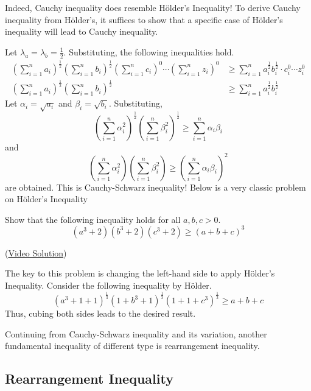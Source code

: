\documentclass[../../../main.tex]{subfiles}
\begin{document}
Indeed, Cauchy inequality does resemble Hölder's Inequality!
To derive Cauchy inequality from Hölder's, it suffices to show
that a specific case of Hölder's inequality will lead to
Cauchy inequality.

Let $\lambda_a = \lambda_b = \frac{1}{2}$. Substituting,
the following inequalities hold.
\begin{align*}
    \left( \sum_{i=1}^n a_i \right)^\frac{1}{2}
    \left( \sum_{i=1}^n b_i \right)^\frac{1}{2}
    \left( \sum_{i=1}^n c_i \right)^0 \cdots
    \left( \sum_{i=1}^n z_i \right)^0
    &\geq
    \sum_{i=1}^n
        a_i^{\frac{1}{2}} b_i^{\frac{1}{2}} \cdot
        c_i^0 \cdots z_i^0 \\
    \left( \sum_{i=1}^n a_i \right)^\frac{1}{2}
    \left( \sum_{i=1}^n b_i \right)^\frac{1}{2}
    &\geq
    \sum_{i=1}^n a_i^\frac{1}{2} b_i^\frac{1}{2}
\end{align*}
Let $\alpha_i = \sqrt{a_i}$ and $\beta_i = \sqrt{b_i}$. Substituting,
\[
\left( \sum_{i=1}^n \alpha_i^2 \right)^\frac{1}{2}
\left( \sum_{i=1}^n \beta_i^2 \right)^\frac{1}{2}
\geq
\sum_{i=1}^n \alpha_i \beta_i
\]
and
\[
\left( \sum_{i=1}^n \alpha_i^2 \right)
\left( \sum_{i=1}^n \beta_i^2 \right)
\geq
\left( \sum_{i=1}^n \alpha_i \beta_i \right)^2
\]
are obtained. This is Cauchy-Schwarz inequality! Below is a very
classic problem on Hölder's Inequality

\begin{problem}{}{}
Show that the following inequality holds for all $a, b, c > 0$.
\[
(a^3 + 2)(b^3 + 2)(c^3 + 2) \geq (a + b + c)^3
\]
\end{problem}

(\href{https://youtu.be/FUtgo54gq7I}{Video Solution})

\begin{solution}
The key to this problem is changing the left-hand side to apply
Hölder's Inequality. Consider the following inequality by Hölder.
\[
(a^3 + 1 + 1)^\frac{1}{3} (1 + b^3 + 1)^\frac{1}{3}
    (1 + 1 + c^3)^\frac{1}{3}
\geq a + b + c
\]
Thus, cubing both sides leads to the desired result.
\end{solution}

Continuing from Cauchy-Schwarz inequality and its variation, another
fundamental inequality of different type is rearrangement inequality.

\subsection{Rearrangement Inequality}
\end{document}
